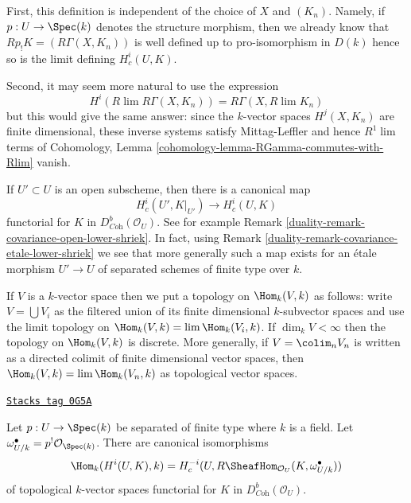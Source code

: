 \medskip\noindent
First, this definition is independent of the choice of $X$ and $(K_n)$.
Namely, if $p : U \to \Spec(k)$ denotes the structure morphism, then
we already know that $Rp_!K = (R\Gamma(X, K_n))$
is well defined up to pro-isomorphism in $D(k)$ hence so is the limit
defining $H^i_c(U, K)$.

\medskip\noindent
Second, it may seem more natural to use the expression
$$
H^i(R\lim R\Gamma(X, K_n)) = R\Gamma(X, R\lim K_n)
$$
but this would give the same answer: since the $k$-vector spaces
$H^j(X, K_n)$ are finite dimensional, these inverse systems satisfy
Mittag-Leffler and hence $R^1\lim$ terms of Cohomology, Lemma
\ref{cohomology-lemma-RGamma-commutes-with-Rlim} vanish.

\medskip\noindent
If $U' \subset U$ is an open subscheme, then there is a canonical map
$$
H^i_c(U', K|_{U'}) \longrightarrow H^i_c(U, K)
$$
functorial for $K$ in $D^b_{\textit{Coh}}(\mathcal{O}_U)$.
See for example Remark \ref{duality-remark-covariance-open-lower-shriek}.
In fact, using Remark \ref{duality-remark-covariance-etale-lower-shriek}
we see that more generally such a map exists for an \'etale morphism
$U' \to U$ of separated schemes of finite type over $k$.

\medskip\noindent
If $V$ is a $k$-vector space then we put a topology on $\Hom_k(V, k)$
as follows: write $V = \bigcup V_i$ as the filtered union of its finite
dimensional $k$-subvector spaces and use the limit topology on
$\Hom_k(V, k) = \lim \Hom_k(V_i, k)$. If $\dim_k V < \infty$ then
the topology on $\Hom_k(V, k)$ is discrete. More generally, if
$V = \colim_n V_n$ is written as a directed colimit of finite dimensional
vector spaces, then $\Hom_k(V, k) = \lim \Hom_k(V_n, k)$ as topological
vector spaces.

\begin{lemma}
\label{duality-lemma-duality-compact-support}
\href{https://stacks.math.columbia.edu/tag/0G5A}{\texttt{Stacks tag 0G5A}}

Let $p : U \to \Spec(k)$ be separated of finite type where $k$ is a field.
Let $\omega_{U/k}^\bullet = p^!\mathcal{O}_{\Spec(k)}$.
There are canonical isomorphisms
$$
\Hom_k(H^i(U, K), k) =
H^{-i}_c(U, R\SheafHom_{\mathcal{O}_U}(K, \omega_{U/k}^\bullet))
$$
of topological $k$-vector spaces
functorial for $K$ in $D^b_{\textit{Coh}}(\mathcal{O}_U)$.
\end{lemma}

